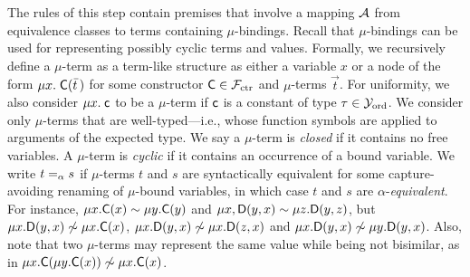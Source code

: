 The rules of this step contain premises that involve a mapping $\mathcal{A}$ from equivalence classes to terms containing $\mu$-bindings.
Recall that $\mu$-bindings can be used for representing possibly cyclic terms and values.
Formally, we recursively define a $\mu$-term as a term-like structure as either a variable $x$
or a node of the form
$\mu x.\; \textsf{C}( \bar t\, )$ for some constructor $\textsf{C} \in \mathcal{F}_{\mathrm{ctr}}$ and $\mu$-terms $\vec t$.
For uniformity, we also consider $\mu x.\; \textsf{c}$ to be a $\mu$-term
if $\textsf{c}$ is a constant of type $\tau \in \mathcal{Y}_{\mathrm{ord}}$.
We consider only $\mu$-terms that are well-typed---i.e., whose function symbols
are applied to arguments of the expected type.
We say a $\mu$-term is \emph{closed} if %
it contains no free variables.
A $\mu$-term is \emph{cyclic} if %
it contains an occurrence of a bound variable.
We write $t \mathrel{=_\alpha} s$ if $\mu$-terms $t$ and $s$ are syntactically equivalent for some capture-avoiding renaming of $\mu$-bound variables,
in which case $t$ and $s$ are $\alpha$-\emph{equivalent}.
For instance, 
$\mu x. \textsf{C}( x ) \sim \mu y. \textsf{C}( y )$ and
$\mu x, \textsf{D}( y, x ) \sim \mu z. \textsf{D}( y, z )$, but
$\mu x. \textsf{D}( y, x ) \not\sim \mu x. \textsf{C}( x )$,
$\mu x. \textsf{D}( y, x ) \not\sim \mu x. \textsf{D}( z, x )$ and
$\mu x. \textsf{D}( y, x ) \not\sim \mu y. \textsf{D}( y, x )$.
Also, note that
two $\mu$-terms may represent the same value while being not bisimilar, as in
$\mu x. \textsf{C}( \mu y. \textsf{C}( x ) ) \not\sim \mu x. \textsf{C}( x )$.

